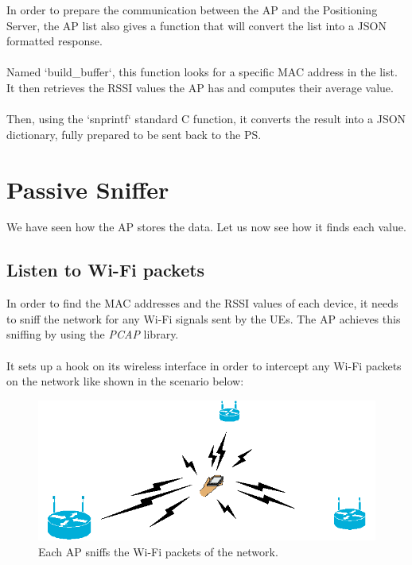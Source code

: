 In order to prepare the communication between the AP and the Positioning
Server, the AP list also gives a function that will convert the list into a
JSON formatted response.

\paragraph{}
Named `build\_buffer`, this function looks for a specific MAC address in the
list. It then retrieves the RSSI values the AP has and computes their average
value.

\paragraph{}
Then, using the `snprintf` standard C function, it converts the result into a
JSON dictionary, fully prepared to be sent back to the PS.

\section{Passive Sniffer}

We have seen how the AP stores the data. Let us now see how it finds each
value.

\subsection{Listen to Wi-Fi packets}

In order to find the MAC addresses and the RSSI values of each device, it needs
to sniff the network for any Wi-Fi signals sent by the UEs. The AP achieves
this sniffing by using the \emph{PCAP} library.

\paragraph{}
It sets up a hook on its wireless interface in order to intercept any
Wi-Fi packets on the network like shown in the scenario below:

\begin{figure}[H]
  \centering
  \includegraphics[scale=.5]{./ap/mobile_with_aps.png}
  \caption{Each AP sniffs the Wi-Fi packets of the network.}
\end{figure}

